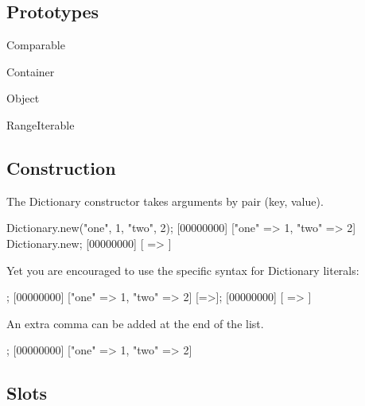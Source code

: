 \subsection{Prototypes}

\begin{refObjects}
\item[Comparable]
\item[Container]
\item[Object]
\item[RangeIterable]
\end{refObjects}

\subsection{Construction}

The Dictionary constructor takes arguments by pair (key, value).

\begin{urbiscript}
Dictionary.new("one", 1, "two", 2);
[00000000] ["one" => 1, "two" => 2]
Dictionary.new;
[00000000] [ => ]
\end{urbiscript}

Yet you are encouraged to use the specific syntax for Dictionary
literals:

\begin{urbiscript}
["one" => 1, "two" => 2];
[00000000] ["one" => 1, "two" => 2]
[=>];
[00000000] [ => ]
\end{urbiscript}

An extra comma can be added at the end of the list.

\begin{urbiscript}
[
  "one" => 1,
  "two" => 2,
];
[00000000] ["one" => 1, "two" => 2]
\end{urbiscript}

\subsection{Slots}


